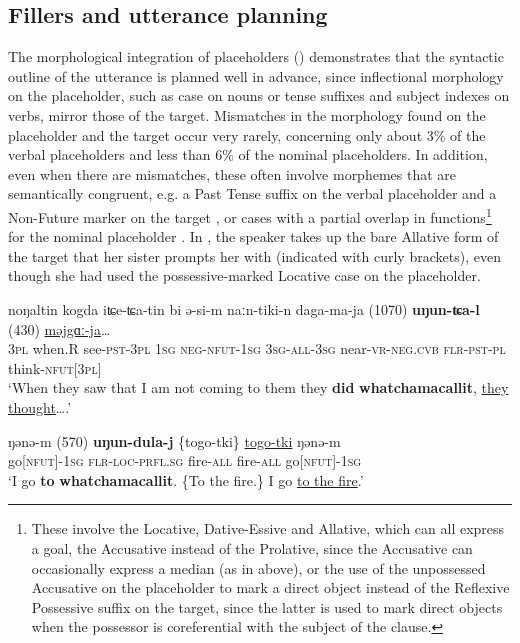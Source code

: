 \documentclass[output=paper]{langscibook}
\begin{document}
\subsection{Fillers and utterance planning}
\label{sec:pakendorf:5.2}
The morphological integration of placeholders () demonstrates that the syntactic outline of the utterance is planned well in advance, since inflectional morphology on the placeholder, such as case on nouns or tense suffixes and subject indexes on verbs, mirror those of the target. Mismatches in the morphology found on the placeholder and the target occur very rarely, concerning only about 3\% of the verbal placeholders and less than 6\% of the nominal placeholders. In addition, even when there are mismatches, these often involve morphemes that are semantically congruent, e.g. a Past Tense suffix on the verbal placeholder and a Non-Future marker on the target , or cases with a partial overlap in functions\footnote{These involve the Locative, Dative-Essive and Allative, which can all express a goal, the Accusative instead of the Prolative, since the Accusative can occasionally express a median (as in  above), or the use of the unpossessed Accusative on the placeholder to mark a direct object instead of the Reflexive Possessive suffix on the target, since the latter is used to mark direct objects when the possessor is coreferential with the subject of the clause.} for the nominal placeholder . In , the speaker takes up the bare Allative form of the target that her sister prompts her with (indicated with curly brackets), even though she had used the possessive-marked Locative case on the placeholder.


\ea \label{ex:pakendorf:51}
\gll noŋaltin
	kogda
	iʨe-ʨa-tin
	bi
	ə-si-m
	naːn-tiki-n
	daga-ma-ja
	(1070)
	\textbf{uŋun-ʨa-l}
	(430)
	\uline{məjgɑː-ja}… \\
     \textsc{3pl}
     when.R
     see-\textsc{pst-3pl}
     \textsc{1sg}
     \textsc{neg-nfut-1sg}
     \textsc{3sg-all-3sg}
     near-\textsc{vr-neg.cvb}
     {}
     \textsc{flr-pst-pl}
     {}
     think-\textsc{nfut[3pl]}\\
\glt ‘When they saw that I am not coming to them they \textbf{did} \textbf{whatchamacallit}, \uline{they thought}….’ 
\z


\ea \label{ex:pakendorf:52}
\gll ŋənə-m \textup{(570)} \textbf{uŋun-dula-j} \{togo-tki\} \uline{togo-tki} ŋənə-m\\
     go[\textsc{nfut]-1sg} {} \textsc{flr-loc-prfl.sg} fire-\textsc{all} fire-\textsc{all} go[\textsc{nfut]-1sg}\\
\glt ‘I go \textbf{to} \textbf{whatchamacallit}. \{To the fire.\} I go \uline{to the fire}.’ 
\z
\end{document}
